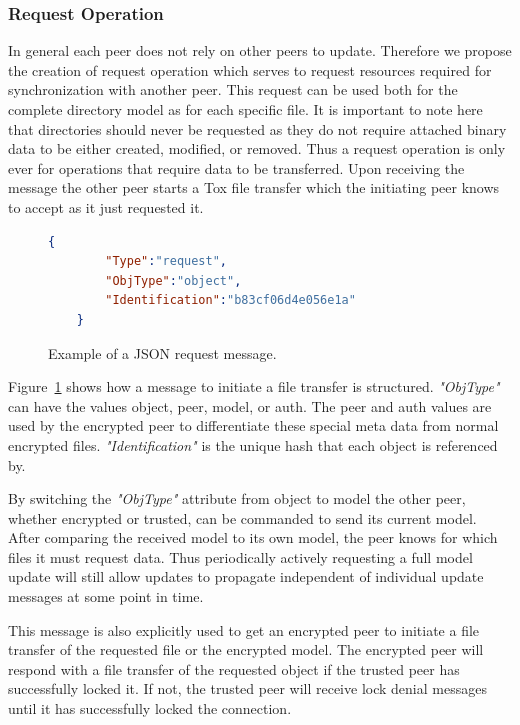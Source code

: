 \subsubsection{Request Operation}
\label{subs:Request Operation}

In general each peer does not rely on other peers to update.
Therefore we propose the creation of request operation which serves to request resources required for synchronization with another peer.
This request can be used both for the complete directory model as for each specific file.
It is important to note here that directories should never be requested as they do not require attached binary data to be either created, modified, or removed.
Thus a request operation is only ever for operations that require data to be transferred.
Upon receiving the message the other peer starts a Tox file transfer which the initiating peer knows to accept as it just requested it.

\begin{figure}[htp]
    \begin{lstlisting}[language=json,firstnumber=0]
    {
        "Type":"request",
        "ObjType":"object",
        "Identification":"b83cf06d4e056e1a"
    }
    \end{lstlisting}
\caption[Request Message]{Example of a JSON request message.}
\label{json:request_message}
\end{figure}

Figure~\ref{json:request_message} shows how a message to initiate a file transfer is structured.
\textit{"ObjType"} can have the values object, peer, model, or auth.
The peer and auth values are used by the encrypted peer to differentiate these special meta data from normal encrypted files.
\textit{"Identification"} is the unique hash that each object is referenced by.

By switching the \textit{"ObjType"} attribute from object to model the other peer, whether encrypted or trusted, can be commanded to send its current model.
After comparing the received model to its own model, the peer knows for which files it must request data.
Thus periodically actively requesting a full model update will still allow updates to propagate independent of individual update messages at some point in time.

This message is also explicitly used to get an encrypted peer to initiate a file transfer of the requested file or the encrypted model.
The encrypted peer will respond with a file transfer of the requested object if the trusted peer has successfully locked it.
If not, the trusted peer will receive lock denial messages until it has successfully locked the connection.

